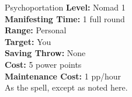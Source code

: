 {Psychoportation}
{
	\textbf{Level:}
	Nomad 1\\
	\textbf{Manifesting Time:}
	1 full round\\
	\textbf{Range:}
	Personal\\
	\textbf{Target:}
	You\\
	\textbf{Saving Throw:}
	None\\
	\textbf{Cost:}
	5 power points\\
	\textbf{Maintenance Cost:}
	1 pp/hour\\
}
{
	As the  spell, except as noted here.
}
